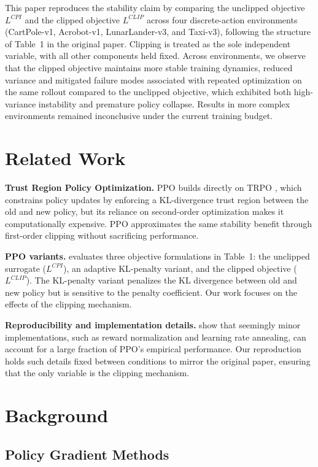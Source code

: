 \documentclass{article}
\begin{document}
This paper reproduces the stability claim by comparing the unclipped objective $L^{CPI}$ and the clipped objective $L^{CLIP}$ across four discrete-action environments (CartPole-v1, Acrobot-v1, LunarLander-v3, and Taxi-v3), following the structure of Table~1 in the original paper. Clipping is treated as the sole independent variable, with all other components held fixed. Across environments, we observe that the clipped objective maintains more stable training dynamics, reduced variance and mitigated failure modes associated with repeated optimization on the same rollout compared to the unclipped objective, which exhibited both high-variance instability and premature policy collapse. Results in more complex environments remained inconclusive under the current training budget.

\section{Related Work}

\textbf{Trust Region Policy Optimization.} PPO builds directly on TRPO \citep{schulman2017trpo}, which constrains policy updates by enforcing a KL-divergence trust region between the old and new policy, but its reliance on second-order optimization makes it computationally expensive. PPO approximates the same stability benefit through first-order clipping without sacrificing performance.

\textbf{PPO variants.} \citet{schulman2017ppo} evaluates three objective formulations in Table~1: the unclipped surrogate ($L^{CPI}$), an adaptive KL-penalty variant, and the clipped objective ($L^{CLIP}$). The KL-penalty variant penalizes the KL divergence between old and new policy but is sensitive to the penalty coefficient. Our work focuses on the effects of the clipping mechanism.

\textbf{Reproducibility and implementation details.} \citet{engstrom2020implementation} show that seemingly minor implementations, such as reward normalization and learning rate annealing, can account for a large fraction of PPO's empirical performance. Our reproduction holds such details fixed between conditions to mirror the original paper, ensuring that the only variable is the clipping mechanism.

\section{Background}

\subsection{Policy Gradient Methods}
\end{document}
